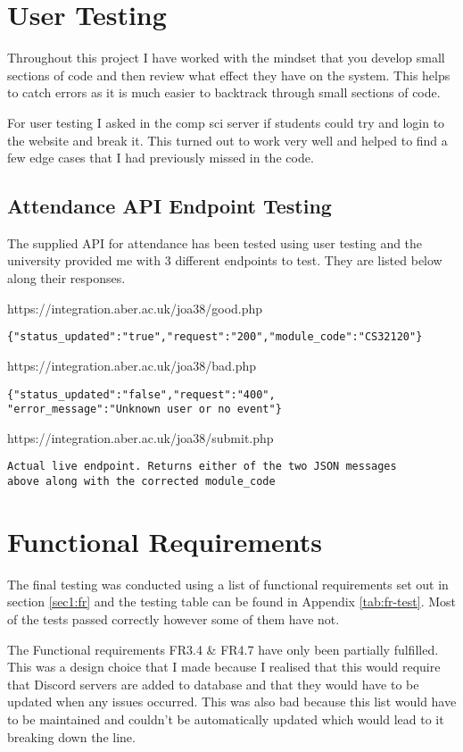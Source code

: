 \section{User Testing}
Throughout this project I have worked with the mindset that you develop small sections of code and then review what effect they have on the system. This helps to catch errors as it is much easier to backtrack through small sections of code.

For user testing I asked in the comp sci server if students could try and login to the website and break it. This turned out to work very well and helped to find a few edge cases that I had previously missed in the code.

\subsection{Attendance API Endpoint Testing}
The supplied API for attendance has been tested using user testing and the university provided me with 3 different endpoints to test. They are listed below along their responses.

https://integration.aber.ac.uk/joa38/good.php

\begin{verbatim}
{"status_updated":"true","request":"200","module_code":"CS32120"}    
\end{verbatim}

https://integration.aber.ac.uk/joa38/bad.php

\begin{verbatim}
{"status_updated":"false","request":"400",
"error_message":"Unknown user or no event"}
\end{verbatim}

https://integration.aber.ac.uk/joa38/submit.php

\begin{verbatim}
Actual live endpoint. Returns either of the two JSON messages 
above along with the corrected module_code
\end{verbatim}

\section{Functional Requirements}\label{sec4:fr}
The final testing was conducted using a list of functional requirements set out in section \ref{sec1:fr} and the testing table can be found in Appendix \ref{tab:fr-test}. Most of the tests passed correctly however some of them have not.

The Functional requirements FR3.4 \& FR4.7 have only been partially fulfilled. This was a design choice that I made because I realised that this would require that Discord servers are added to database and that they would have to be updated when any issues occurred. This was also bad because this list would have to be maintained and couldn't be automatically updated which would lead to it breaking down the line.